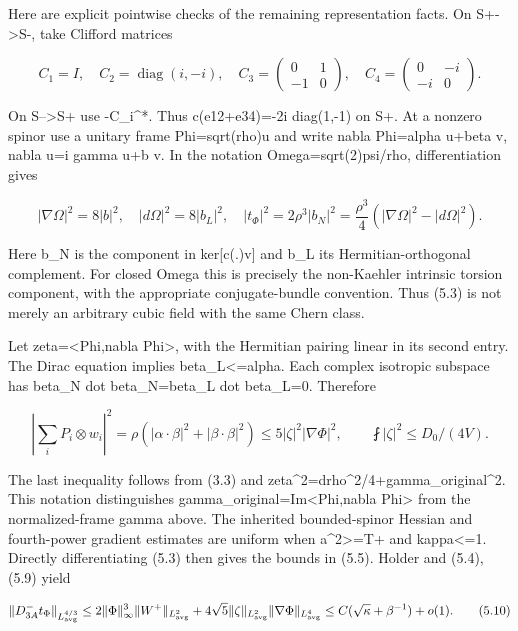 \documentclass[
  10pt,
]{article}
\begin{document}
Here are explicit pointwise checks of the remaining representation
facts. On S+-\textgreater S-, take Clifford matrices

\[
 C_1=I,\quad C_2=\operatorname{diag}(i,-i),\quad
 C_3=\begin{pmatrix}0&1\\-1&0\end{pmatrix},\quad
 C_4=\begin{pmatrix}0&-i\\-i&0\end{pmatrix}.
\]

On S--\textgreater S+ use -C\_i\^{}*. Thus c(e12+e34)=-2i diag(1,-1) on
S+. At a nonzero spinor use a unitary frame Phi=sqrt(rho)u and write
nabla Phi=alpha u+beta v, nabla u=i gamma u+b v. In the notation
Omega=sqrt(2)psi/rho, differentiation gives

\[
 |\nabla\Omega|^2=8|b|^2,\quad |d\Omega|^2=8|b_L|^2,
 \quad |t_\Phi|^2=2\rho^3|b_N|^2
    =\frac{\rho^3}{4}(|\nabla\Omega|^2-|d\Omega|^2).
                                                        \tag{5.8}
\]

Here b\_N is the component in ker{[}c(.)v{]} and b\_L its
Hermitian-orthogonal complement. For closed Omega this is precisely the
non-Kaehler intrinsic torsion component, with the appropriate
conjugate-bundle convention. Thus (5.3) is not merely an arbitrary cubic
field with the same Chern class.

Let zeta=\textless Phi,nabla Phi\textgreater, with the Hermitian pairing
linear in its second entry. The Dirac equation implies
\textbar beta\_L\textbar\textless=\textbar alpha\textbar. Each complex
isotropic subspace has beta\_N dot beta\_N=beta\_L dot beta\_L=0.
Therefore

\[
 \left|\sum_iP_i\otimes w_i\right|^2
   =\rho(|\alpha\mathbin\cdot\beta|^2+|\beta\mathbin\cdot\beta|^2)
   \le5|\zeta|^2|\nabla\Phi|^2,\qquad
 \fint|\zeta|^2\le D_0/(4V).                          \tag{5.9}
\]

The last inequality follows from (3.3) and
\textbar zeta\textbar\^{}2=\textbar drho\textbar\^{}2/4+\textbar gamma\_original\textbar\^{}2.
This notation distinguishes gamma\_original=Im\textless Phi,nabla
Phi\textgreater{} from the normalized-frame gamma above. The inherited
bounded-spinor Hessian and fourth-power gradient estimates are uniform
when a\^{}2\textgreater=T+ and kappa\textless=1. Directly
differentiating (5.3) then gives the bounds in (5.5). Holder and (5.4),
(5.9) yield

\[
 \|D^-_{3A}t_\Phi\|_{L^{4/3}_{\rm avg}}
 \le2\|\Phi\|_\infty^3\|W^+\|_{L^2_{\rm avg}}
   +4\sqrt5\|\zeta\|_{L^2_{\rm avg}}
                     \|\nabla\Phi\|_{L^4_{\rm avg}}
 \le C(\sqrt\kappa+\beta^{-1})+o(1).                  \tag{5.10}
\]
\end{document}
